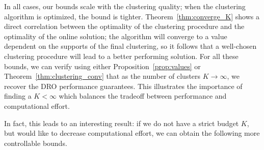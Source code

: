 \documentclass[12pt]{article}
\newcommand{\prob}{{\mathbf P}}
\begin{document}
In all cases, our bounds scale with the clustering quality; when the clustering algorithm is optimized, the bound is tighter. 
Theorem~\ref{thm:converge_K} shows a direct correlation between the optimality of the clustering procedure and the optimality of the online solution; the algorithm will converge to a value dependent on the supports of the final clustering, so it follows that a well-chosen clustering procedure will lead to a better performing solution. 
For all these bounds, we can verify using either Proposition~\ref{prop:values} or Theorem~\ref{thm:clustering_conv} that as the number of clusters $K \to \infty$, 
we recover the \gls{DRO} performance guarantees.
This illustrates the importance of finding a $K < \infty$ which balances the tradeoff between performance and computational effort.

\ifpreprint 
In fact, this leads to an interesting result: if we do not have a strict budget $K$, but would like to decrease computational effort, we can obtain the following more controllable bounds.
\end{document}
